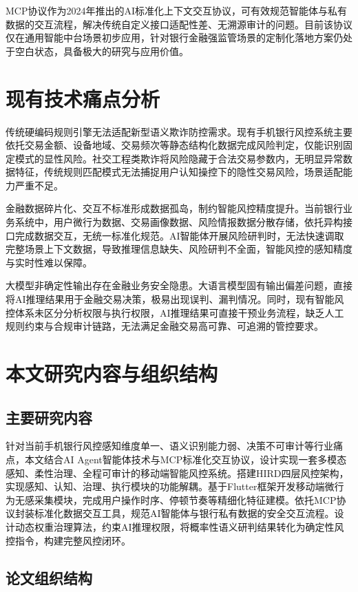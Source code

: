 \documentclass{xduugthesis}
\begin{document}
MCP协议作为2024年推出的AI标准化上下文交互协议，可有效规范智能体与私有数据的交互流程，解决传统自定义接口适配性差、无溯源审计的问题。目前该协议仅在通用智能中台场景初步应用，针对银行金融强监管场景的定制化落地方案仍处于空白状态，具备极大的研究与应用价值。

\section{现有技术痛点分析}

传统硬编码规则引擎无法适配新型语义欺诈防控需求。现有手机银行风控系统主要依托交易金额、设备地域、交易频次等静态结构化数据完成风险判定，仅能识别固定模式的显性风险。社交工程类欺诈将风险隐藏于合法交易参数内，无明显异常数据特征，传统规则匹配模式无法捕捉用户认知操控下的隐性交易风险，场景适配能力严重不足\cite{nicolaou2025llm}。

金融数据碎片化、交互不标准形成数据孤岛，制约智能风控精度提升。当前银行业务系统中，用户微行为数据、交易画像数据、风险情报数据分散存储，依托异构接口完成数据交互，无统一标准化规范。AI智能体开展风险研判时，无法快速调取完整场景上下文数据，导致推理信息缺失、风险研判不全面，智能风控的感知精度与实时性难以保障。

大模型非确定性输出存在金融业务安全隐患。大语言模型固有输出偏差问题，直接将AI推理结果用于金融交易决策，极易出现误判、漏判情况。同时，现有智能风控体系未区分分析权限与执行权限，AI推理结果可直接干预业务流程，缺乏人工规则约束与合规审计链路，无法满足金融交易高可靠、可追溯的管控要求。

\section{本文研究内容与组织结构}

\subsection{主要研究内容}

针对当前手机银行风控感知维度单一、语义识别能力弱、决策不可审计等行业痛点，本文结合AI Agent智能体技术与MCP标准化交互协议，设计实现一套多模态感知、柔性治理、全程可审计的移动端智能风控系统。搭建HIRD四层风控架构，实现感知、认知、治理、执行模块的功能解耦\cite{agnihotram2025agentic}。基于Flutter框架开发移动端微行为无感采集模块，完成用户操作时序、停顿节奏等精细化特征建模。依托MCP协议封装标准化数据交互工具，规范AI智能体与银行私有数据的安全交互流程。设计动态权重治理算法，约束AI推理权限，将概率性语义研判结果转化为确定性风控指令，构建完整风控闭环。

\subsection{论文组织结构}
\end{document}
